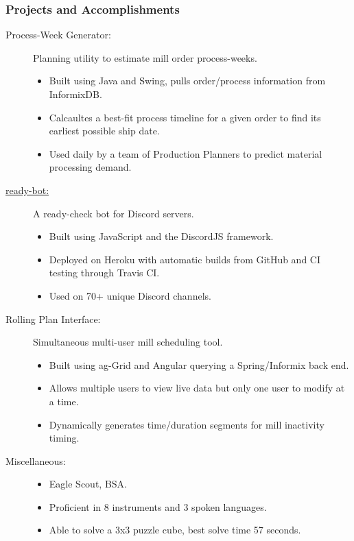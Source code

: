 \documentclass{article}
\begin{document}
\subsubsection*{Projects and Accomplishments}
    \begin{description}
        \item[Process-Week Generator:] Planning utility to estimate mill order process-weeks.
            \begin{itemize}
                \item Built using Java and Swing, pulls order/process information from InformixDB.
                \item Calcaultes a best-fit process timeline for a given order to find its earliest possible ship date.
                \item Used daily by a team of Production Planners to predict material processing demand.
            \end{itemize}

            \vspace{0.5em}

        \item[\href{https://www.github.com/BurnsCommaLucas/ready-bot}{ready-bot:}] A ready-check bot for Discord servers.
            \begin{itemize}
                \item Built using JavaScript and the DiscordJS framework.
                \item Deployed on Heroku with automatic builds from GitHub and CI testing through Travis CI.
                \item Used on 70+ unique Discord channels.
            \end{itemize}

            \vspace{0.5em}

        \item[Rolling Plan Interface:] Simultaneous multi-user mill scheduling tool.
            \begin{itemize}
                \item Built using ag-Grid and Angular querying a Spring/Informix back end.
                \item Allows multiple users to view live data but only one user to modify at a time.
                \item Dynamically generates time/duration segments for mill inactivity timing.
            \end{itemize}

            \vspace{0.5em}

        \item[Miscellaneous:] \hfill
            \begin{itemize}
                \item Eagle Scout, BSA.
                \item Proficient in 8 instruments and 3 spoken languages.
                \item Able to solve a 3x3 puzzle cube, best solve time 57 seconds.
        \end{itemize}
    \end{description}
    
\end{document}
